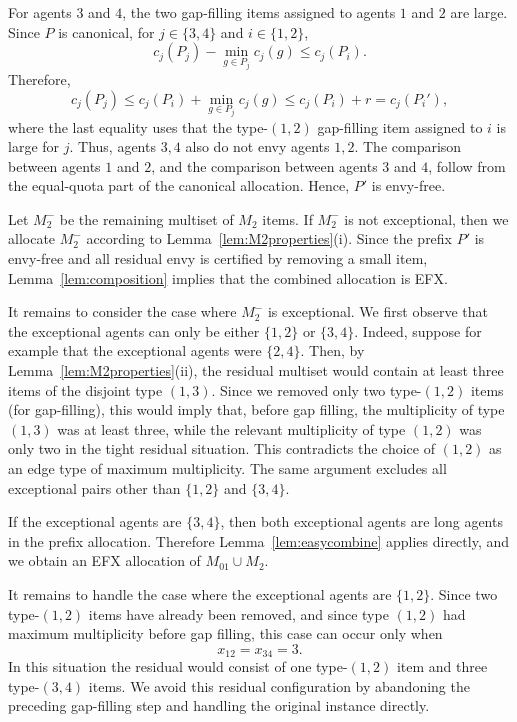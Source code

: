 \documentclass{article}
\theoremstyle{definition}
\begin{document}
For agents $3$ and $4$, the two gap-filling items assigned to agents $1$ and
$2$ are large.  Since $P$ is canonical, for $j\in\{3,4\}$ and
$i\in\{1,2\}$,
\[
    c_j(P_j)-\min_{g\in P_j}c_j(g)\le c_j(P_i).
\]
Therefore,
\[
    c_j(P_j)
    \le c_j(P_i)+\min_{g\in P_j}c_j(g)
    \le c_j(P_i)+r
    = c_j(P_i'),
\]
where the last equality uses that the type-$(1,2)$ gap-filling item assigned
to $i$ is large for $j$.  Thus, agents $3,4$ also do not envy agents $1,2$.
The comparison between agents $1$ and $2$, and the comparison between agents
$3$ and $4$, follow from the equal-quota part of the canonical allocation.
Hence, $P'$ is envy-free.

Let $M_2^-$ be the remaining multiset of $M_2$ items.  If $M_2^-$ is not
exceptional, then we allocate $M_2^-$ according to
Lemma~\ref{lem:M2properties}(i).  Since the prefix $P'$ is envy-free and all
residual envy is certified by removing a small item, Lemma~\ref{lem:composition}
implies that the combined allocation is EFX.

It remains to consider the case where $M_2^-$ is exceptional.  We first observe
that the exceptional agents can only be either $\{1,2\}$ or $\{3,4\}$.
Indeed, suppose for example that the exceptional agents were $\{2,4\}$.
Then, by Lemma~\ref{lem:M2properties}(ii), the residual multiset would contain
at least three items of the disjoint type $(1,3)$.  Since we removed only two
type-$(1,2)$ items (for gap-filling), this would imply that, before gap filling, the multiplicity of type $(1,3)$ was at least three, while the relevant multiplicity of type $(1,2)$ was only two in the tight residual situation.  This contradicts the choice of $(1,2)$ as an edge type of maximum multiplicity.  
The same argument excludes all exceptional pairs other than $\{1,2\}$ and $\{3,4\}$.

If the exceptional agents are $\{3,4\}$, then both exceptional agents are long
agents in the prefix allocation.  Therefore Lemma~\ref{lem:easycombine}
applies directly, and we obtain an EFX allocation of $M_{01}\cup M_2$.

It remains to handle the case where the exceptional agents are $\{1,2\}$.
Since two type-$(1,2)$ items have already been removed, and since
type $(1,2)$ had maximum multiplicity before gap filling, this case can occur
only when
\[
    x_{12}=x_{34}=3.
\]
In this situation the residual would consist of one type-$(1,2)$ item and
three type-$(3,4)$ items.  We avoid this residual configuration by abandoning
the preceding gap-filling step and handling the original instance directly.
\end{document}

